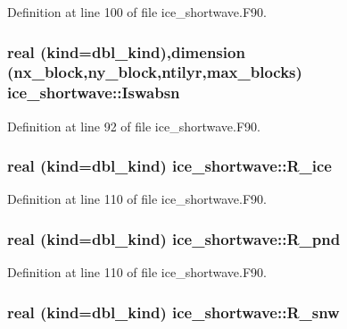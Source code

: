 Definition at line 100 of file ice\_\-shortwave.F90.\hypertarget{namespaceice__shortwave_ab47843d78d636ebc26ad1cbccdd855e0}{
\subsubsection[{Iswabsn}]{\setlength{\rightskip}{0pt plus 5cm}real (kind=dbl\_\-kind),dimension (nx\_\-block,ny\_\-block,ntilyr,max\_\-blocks) {\bf ice\_\-shortwave::Iswabsn}}}
\label{namespaceice__shortwave_ab47843d78d636ebc26ad1cbccdd855e0}


Definition at line 92 of file ice\_\-shortwave.F90.\hypertarget{namespaceice__shortwave_a24f28156b34d4f65677538c86071d9ae}{
\subsubsection[{R\_\-ice}]{\setlength{\rightskip}{0pt plus 5cm}real (kind=dbl\_\-kind) {\bf ice\_\-shortwave::R\_\-ice}}}
\label{namespaceice__shortwave_a24f28156b34d4f65677538c86071d9ae}


Definition at line 110 of file ice\_\-shortwave.F90.\hypertarget{namespaceice__shortwave_aff78b63ae903ff25c0dac10823ea0c9b}{
\subsubsection[{R\_\-pnd}]{\setlength{\rightskip}{0pt plus 5cm}real (kind=dbl\_\-kind) {\bf ice\_\-shortwave::R\_\-pnd}}}
\label{namespaceice__shortwave_aff78b63ae903ff25c0dac10823ea0c9b}


Definition at line 110 of file ice\_\-shortwave.F90.\hypertarget{namespaceice__shortwave_aa81b977d29eec195afdf7d4a8eed13df}{
\subsubsection[{R\_\-snw}]{\setlength{\rightskip}{0pt plus 5cm}real (kind=dbl\_\-kind) {\bf ice\_\-shortwave::R\_\-snw}}}
\label{namespaceice__shortwave_aa81b977d29eec195afdf7d4a8eed13df}


